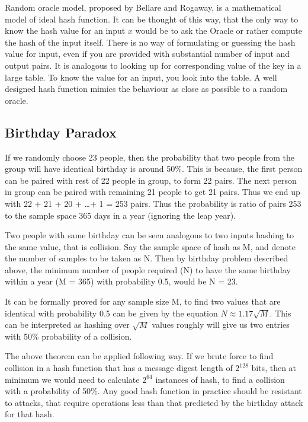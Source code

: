   Random oracle model, proposed by Bellare and Rogaway, is a mathematical model of ideal hash function.
  It can be thought of this way, that the only way to know the hash value for an input $x$ would be to
  ask the Oracle or rather compute the hash of the input itself. There is no way of formulating or 
  guessing the hash value for input, even if you are provided with substantial number of input and output
  pairs. It is analogous to looking up for corresponding value of the key in a large table. To know the
  value for an input, you look into the table. A well designed hash function mimics the behaviour as 
  close as possible to a random oracle. 

  \subsection{ Birthday Paradox }
  If we randomly choose 23 people, then the probability that two people from the group will have identical
  birthday is around 50\%. This is because, the first person can be paired with rest of 22 people in group,
  to form 22 pairs. The next person in group can be paired with remaining 21 people to get 21 pairs. Thus 
  we end up with 22 + 21 + 20 + \ldots + 1 = 253 pairs. Thus the probability is ratio of pairs 253 to the
  sample space 365 days in a year (ignoring the leap year).

  Two people with same birthday can be seen analogous to two inputs hashing to the same value, that is 
  collision. Say the sample space of hash as M, and denote the number of samples to be taken as N. Then 
  by birthday problem described above, the minimum number of people required (N) to have the same birthday 
  within a year (M = 365) with probability 0.5, would be N = 23.

  It can be formally proved for any sample size M, to find two values that are identical with probability
  0.5 can be given by the equation $N \approx 1.17 \sqrt{M}$. This can be interpreted as hashing over $\sqrt{M}$
  values roughly will give us two entries with 50\% probability of a collision.

  The above theorem can be applied following way. If we brute force to find collision in a hash function
  that has a message digest length of $2^{128}$ bits, then at minimum we would need to calculate $2^{64}$
  instances of hash, to find a collision with a probability of 50\%. Any good hash function in practice 
  should be resistant to attacks, that require operations less than that predicted by the birthday attack
  for that hash.

